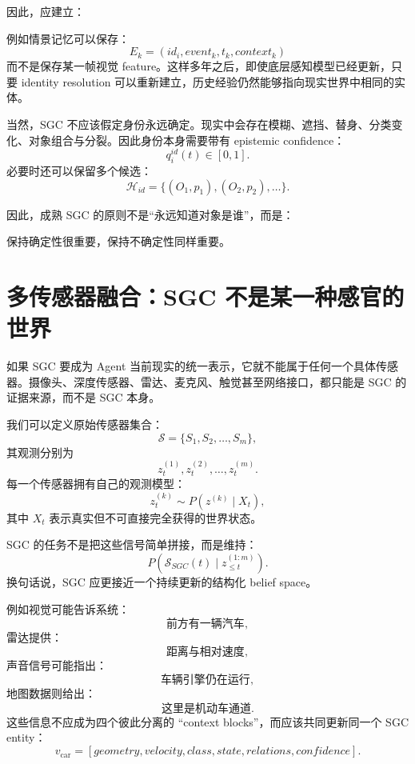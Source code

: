 因此，应建立：
\begin{statementbox}
\centering
{}
\end{statementbox}

例如情景记忆可以保存：
\[
E_k
=
\left(
id_i,
event_k,
t_k,
context_k
\right)
\]
而不是保存某一帧视觉 feature。这样多年之后，即使底层感知模型已经更新，只要 identity resolution 可以重新建立，历史经验仍然能够指向现实世界中相同的实体。

当然，SGC 不应该假定身份永远确定。现实中会存在模糊、遮挡、替身、分类变化、对象组合与分裂。因此身份本身需要带有 epistemic confidence：
\[
q_i^{id}(t)\in[0,1].
\]
必要时还可以保留多个候选：
\[
\mathcal{H}_{id}
=
\{
(O_1,p_1),
(O_2,p_2),
\ldots
\}.
\]

因此，成熟 SGC 的原则不是“永远知道对象是谁”，而是：
\begin{statementbox}
\centering
{}
\end{statementbox}

保持确定性很重要，保持不确定性同样重要。

\section{多传感器融合：SGC 不是某一种感官的世界}

如果 SGC 要成为 Agent 当前现实的统一表示，它就不能属于任何一个具体传感器。摄像头、深度传感器、雷达、麦克风、触觉甚至网络接口，都只能是 SGC 的证据来源，而不是 SGC 本身。

我们可以定义原始传感器集合：
\[
\mathcal{S}
=
\{
S_1,S_2,\ldots,S_m
\},
\]
其观测分别为
\[
z_t^{(1)},z_t^{(2)},\ldots,z_t^{(m)}.
\]
每一个传感器拥有自己的观测模型：
\[
z_t^{(k)}
\sim
P
\left(
z^{(k)}
\mid
X_t
\right),
\]
其中 \(X_t\) 表示真实但不可直接完全获得的世界状态。

SGC 的任务不是把这些信号简单拼接，而是维持：
\[
P
\left(
\mathcal{S}_{SGC}(t)
\mid
z_{\leq t}^{(1:m)}
\right).
\]
换句话说，SGC 应更接近一个持续更新的结构化 belief space。

例如视觉可能告诉系统：
\[
\text{前方有一辆汽车},
\]
雷达提供：
\[
\text{距离与相对速度},
\]
声音信号可能指出：
\[
\text{车辆引擎仍在运行},
\]
地图数据则给出：
\[
\text{这里是机动车通道}.
\]
这些信息不应成为四个彼此分离的 ``context blocks''，而应该共同更新同一个 SGC entity：
\[
v_{\text{car}}
=
[
geometry,
velocity,
class,
state,
relations,
confidence
].
\]


